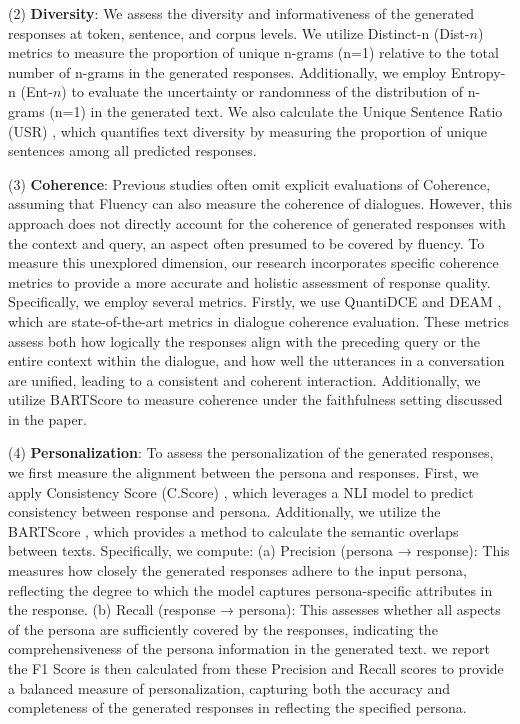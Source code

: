 (2) \textbf{Diversity}: We assess the diversity and informativeness of the generated responses at token, sentence, and corpus levels. We utilize Distinct-n (Dist-$n$) metrics \cite{li-etal-2016-diversity} to measure the proportion of unique n-grams (n=1) relative to the total number of n-grams in the generated responses. Additionally, we employ Entropy-n (Ent-$n$) \cite{zhang-etal-2018-generating} to evaluate the uncertainty or randomness of the distribution of n-grams (n=1) in the generated text. We also calculate the Unique Sentence Ratio (USR) \cite{li-etal-2020-generate}, which quantifies text diversity by measuring the proportion of unique sentences among all predicted responses.

(3) \textbf{Coherence}: Previous studies often omit explicit evaluations of Coherence, assuming that Fluency can also measure the coherence of dialogues. However, this approach does not directly account for the coherence of generated responses with the context and query, an aspect often presumed to be covered by fluency. To measure this unexplored dimension, our research incorporates specific coherence metrics to provide a more accurate and holistic assessment of response quality. Specifically, we employ several metrics. Firstly, we use QuantiDCE \cite{ye-etal-2021-towards-quantifiable} and DEAM \cite{ghazarian-etal-2022-deam}, which are state-of-the-art metrics in dialogue coherence evaluation. These metrics assess both how logically the responses align with the preceding query or the entire context within the dialogue, and how well the utterances in a conversation are unified, leading to a consistent and coherent interaction. Additionally, we utilize BARTScore \cite{yuan-etal-2021-bartscore} to measure coherence under the faithfulness setting discussed in the paper.

(4) \textbf{Personalization}: To assess the personalization of the generated responses, we first measure the alignment between the persona and responses. First, we apply Consistency Score (C.Score) \cite{madotto-etal-2019-personalizing}, which leverages a NLI model to predict consistency between response and persona. Additionally, we utilize the BARTScore \cite{yuan-etal-2021-bartscore}, which provides a method to calculate the semantic overlaps between texts. Specifically, we compute: (a) Precision (persona → response): This measures how closely the generated responses adhere to the input persona, reflecting the degree to which the model captures persona-specific attributes in the response. (b) Recall (response → persona): This assesses whether all aspects of the persona are sufficiently covered by the responses, indicating the comprehensiveness of the persona information in the generated text. we report the F1 Score is then calculated from these Precision and Recall scores to provide a balanced measure of personalization, capturing both the accuracy and completeness of the generated responses in reflecting the specified persona.

